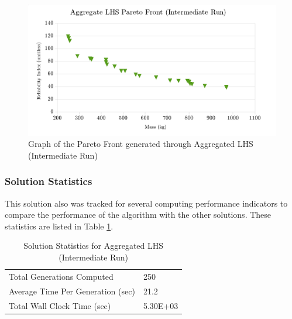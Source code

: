 \begin{figure}[!htbp]
\includegraphics[width=\textwidth]{img/pf_agg_int.png}
\caption{Graph of the Pareto Front generated through Aggregated LHS (Intermediate Run)}
\label{fig:pfront_agg_int}
\end{figure}

\subsubsection{Solution Statistics}
This solution also was tracked for several computing performance indicators to compare the performance of the algorithm with the other solutions. These statistics are listed in Table \ref{tab:stat_agg_int}. 

\begin{table}[!htbp]
  \centering
\caption{Solution Statistics for Aggregated LHS (Intermediate Run)}
  \label{tab:stat_agg_int}
  \begin{tabular}{|l|l|}
    \hline
	  Total Generations Computed & 250\\
    Average Time Per Generation (sec) & 21.2\\
    Total Wall Clock Time (sec)	 & 5.30E+03\\
    \hline
  \end{tabular}
\end{table} 

